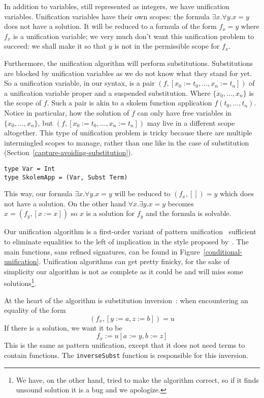 \documentclass[sigconf]{acmart}
\newcommand{\tc}[1]{{\small\texttt{#1}}}
\begin{document}
In addition to variables, still represented as integers, we have unification
variables. Unification variables have their own scopes: the formula
$\exists x. \forall y. x=y$ does not have a solution. It will be reduced to a
formula of the form $f_{x} = y$ where $f_{x}$ is a unification variable; we very much
don't want this unification problem to succeed: we shall make it so that $y$ is not in
the permissible scope for $f_{x}$.

Furthermore, the unification algorithm will perform substitutions. Substitutions are blocked by
unification variables as we do not know what they stand for yet. So a unification
variable, in our syntax, is a pair $(f, [x_0:=t_0,\ldots,x_n:=t_n])$ of a
unification variable proper and a suspended substitution. Where
$\{x_0,\ldots,x_{n}\}$ is the scope of $f$. Such a pair is akin to a skolem
function application $f(t_0,\ldots,t_n)$. Notice in particular, how the solution
of $f$ can only have free variables in $\{x_0,\ldots,x_{n}\}$, but
$(f, [x_0:=t_0,\ldots,x_n:=t_n])$ may live in a different scope altogether.
This type of unification problem is tricky because there are multiple
intermingled scopes to manage, rather than one like
in the case of substitution (Section~\ref{capture-avoiding-substitution}).

\begin{verbatim}
type Var = Int
type SkolemApp = (Var, Subst Term)
\end{verbatim}

This way, our formula $\exists x. \forall y. x=y$ will be reduced to
$(f_{x},[]) = y$ which does not have a solution. On the other hand
$\forall x. \exists y. x = y$ becomes $x = (f_{y}, [x:=x])$ so $x$ is a solution
for $f_{y}$ and the formula is solvable.

Our unification algorithm is a first-order variant of pattern
unification~\cite{miller91-pattern} sufficient to eliminate equalities to the
left of implication in the style proposed by~\citet{miller22}. The main
functions, sans refined signatures, can be found in
Figure~\ref{conditional-unification}. Unification algorithms can get pretty
finicky, for the sake of simplicity our algorithm is not as complete as it could
be and will miss some solutions\footnote{We have, on the other hand, tried to
  make the algorithm correct, so if it finds unsound solution it is a bug and we
  apologize.}.

At the heart of the algorithm is substitution inversion~\cite{ziliani15}: when
encountering an equality of the form
$$(f_{x},[y:=a, z:=b]) = u$$
If there is a solution, we want it to be
$$f_{x} := u[a:=y, b:=z]$$
This is the same as pattern unification, except that it does not need terms to
contain functions. The \tc{inverseSubst} function is responsible for this
inversion.
\end{document}
